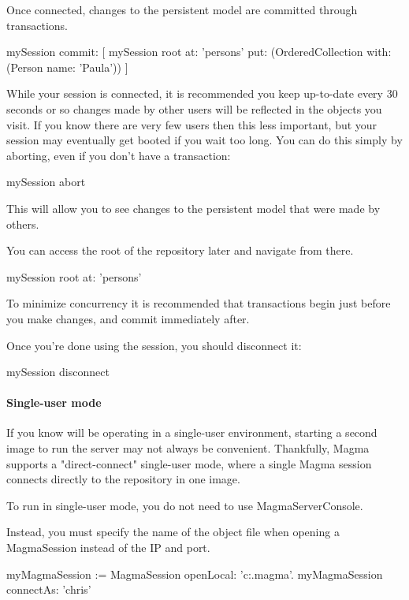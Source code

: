 \documentclass[a4paper,10pt,twoside]{book}
\begin{document}
Once connected, changes to the persistent model are committed through transactions. 

\begin{code}{}
mySession commit: 
	[ mySession root
		at: 'persons'
		put: (OrderedCollection with: (Person name: 'Paula')) ]
\end{code}

While your session is connected, it is recommended you keep up-to-date every 30 seconds or so changes made by other users will be reflected in the objects you visit. If you know there are very few users then this less important, but your session may eventually get booted if you wait too long. You can do this simply by aborting, even if you don't have a transaction:

\begin{code}{}
	mySession abort
\end{code}
This will allow you to see changes to the persistent model that were made by others.

You can access the root of the repository later and navigate from there.

\begin{code}{}
	mySession root at: 'persons'
\end{code}

To minimize concurrency it is recommended that transactions begin just before you make changes, and commit immediately after.

Once you're done using the session, you should disconnect it:
\begin{code}{}
	mySession disconnect
\end{code}

\paragraph{Single-user mode}

If you know will be operating in a single-user environment, starting a second image to run the server may not always be convenient. Thankfully, Magma supports a "direct-connect" single-user mode, where a single Magma session connects directly to the repository in one image.

To run in single-user mode, you do not need to use MagmaServerConsole. 

Instead, you must specify the name of the object file when opening a MagmaSession instead of the IP and port.

\begin{code}{}
	myMagmaSession := MagmaSession openLocal: 'c:\myMagmaFolder\myRepository.magma'.
	myMagmaSession connectAs: 'chris'
\end{code}
\end{document}
